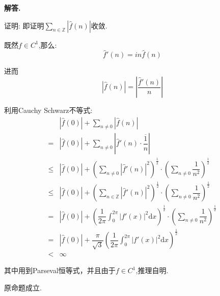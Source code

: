 \documentclass[12pt, a4paper, oneside]{ctexart}
\newenvironment{solution}{\par\noindent\textbf{解答. }}{\par}
\begin{document}
\begin{solution}
\par
证明:
即证明$\sum_{n\in \mathbb{Z}}\left|\hat{f}(n)\right|$收敛.
\par
既然$f\in C^1$,那么:
$$
\hat{f}'(n)=in\hat{f}(n)
$$
\par
进而
$$
\left|\hat{f}(n)\right|=\left|\dfrac{\hat{f}'(n)}{n}\right|
$$
\par
利用Cauchy Schwarz不等式:
$$
\begin{aligned}
&\left|\hat{f}(0)\right|+\sum_{n\ne 0}\left|\hat{f}(n)\right|\\
=&\left|\hat{f}(0)\right|+\sum_{n\ne 0}\left|\hat{f}'(n)\cdot \overline{\dfrac{1}{n}}\right|\\
\leqslant & 
\left|\hat{f}(0)\right|+\left(\sum_{n\ne 0}\left|\hat{f}'(n)\right|^2\right)^{\frac{1}{2}}
\cdot \left(\sum_{n \ne 0}\dfrac{1}{n^2}\right)^{\frac{1}{2}}\\
\leqslant & \left|\hat{f}(0)\right|+\left(\sum_{n \in \mathbb{Z}}\left|\hat{f}'(n)\right|^2\right)^{\frac{1}{2}}
\cdot \left(\sum_{n \ne 0}\dfrac{1}{n^2}\right)^{\frac{1}{2}}\\
=&\left|\hat{f}(0)\right|+\left(\dfrac{1}{2\pi}\int_{0}^{2\pi}\left|{f}'(x)\right|^2\mathrm{d}x\right)^{\frac{1}{2}}
\cdot \left(\sum_{n \ne 0}\dfrac{1}{n^2}\right)^{\frac{1}{2}}\\
=&\left|\hat{f}(0)\right|+\dfrac{\pi}{\sqrt{3}}\left(\dfrac{1}{2\pi}\int_{0}^{2\pi}\left|{f}'(x)\right|^2\mathrm{d}x\right)^{\frac{1}{2}}
\\
<&\infty
\end{aligned}
$$
\par
其中用到Parseval恒等式，并且由于$f\in C^1 $,推理自明.
\par
原命题成立.
\end{solution}
\end{document}

